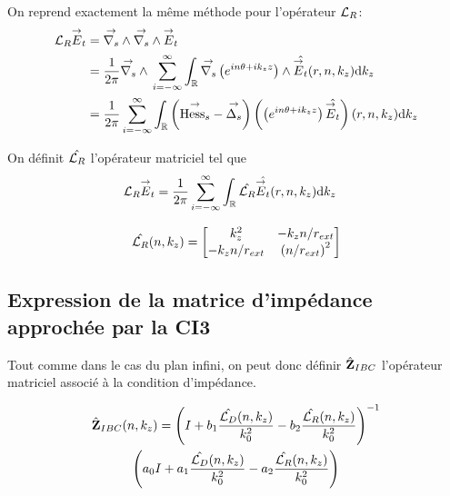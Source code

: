     On reprend exactement la même méthode pour l'opérateur \({\mathcal{L}_R}\):
    \begin{align}
      {\mathcal{L}_R} {\overset{\rightarrow}{E}}_t & = {\overset{\rightarrow}{\nabla_s}} \wedge{} {\overset{\rightarrow}{\nabla_s}} \wedge{} {\overset{\rightarrow}{E}}_t
      \\
      &=\dfrac{1}{2\pi}{\overset{\rightarrow}{\nabla_s}} \wedge{}\sum_{i=-\infty}^\infty\int_\mathbb R {\overset{\rightarrow}{\nabla_s}}{}\left(e^{in\theta + ik_zz}\right) \wedge \hat{{\overset{\rightarrow}{E}}_t}(r,n,k_z)\mathrm{d}{k_z}
      \\
      &= \dfrac{1}{2\pi}\sum_{i=-\infty}^\infty \int_\mathbb R \left({\overset{\rightarrow}{\operatorname{Hess}_s}} - {\overset{\rightarrow}{\Delta_s}}\right) \left(\left(e^{in\theta + ik_zz}\right) \hat{{\overset{\rightarrow}{E}}_t}\right)(r,n,k_z)\mathrm{d}{k_z}
    \end{align}

    On définit \(\hat{{\mathcal{L}_R}}\) l'opérateur matriciel tel que
    \begin{align}
      {\mathcal{L}_R} {\overset{\rightarrow}{E}}_t
      &= \dfrac{1}{2\pi}\sum_{i=-\infty}^\infty\int_\mathbb R \hat{{\mathcal{L}_R}} \hat{{\overset{\rightarrow}{E}}_t}(r,n,k_z)\mathrm{d}{k_z}
    \end{align}

    \begin{equation}
      \hat{{\mathcal{L}_R}}(n,k_z) =
      \begin{bmatrix}
        k_z^2 & -k_z{n}\slash{r_{ext}}
        \\
        -k_z{n}\slash{r_{ext}} & \left({n}\slash{r_{ext}} \right)^2
      \end{bmatrix}
    \end{equation}

  \subsection{Expression de la matrice d'impédance approchée par la CI3}

    Tout comme dans le cas du plan infini, on peut donc définir \(\hat{\mathbf{Z}}_{IBC}\) l’opérateur matriciel associé à la condition d'impédance.

    \begin{multline}
        \hat{\mathbf{Z}}_{IBC}(n,k_z) = \left(I + b_1 \dfrac{\hat{{\mathcal{L}_D}}(n,k_z)}{k_0^2} - b_2 \dfrac{\hat{{\mathcal{L}_R}}(n,k_z)}{k_0^2} \right)^{-1}\\
        \left(a_0 I + a_1 \dfrac{\hat{{\mathcal{L}_D}}(n,k_z)}{k_0^2} - a_2 \dfrac{\hat{{\mathcal{L}_R}}(n,k_z)}{k_0^2}\right)
    \end{multline}
